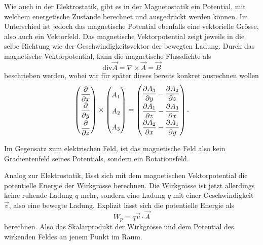 Wie auch in der Elektrostatik, gibt es in der Magnetostatik ein Potential, mit welchem energetische Zustände berechnet und ausgedrückt werden können. Im Unterschied ist jedoch das magnetische Potential ebenfalls eine vektorielle Grösse, also auch ein Vektorfeld. Das magnetische Vektorpotential zeigt jeweils in die selbe Richtung wie der Geschwindigkeitsvektor der bewegten Ladung.
Durch das magnetische Vektorpotential, kann die magnetische Flussdichte als 
\begin{equation}
	\text{div}\vec{A}=\nabla \times \vec{A}
	=
	\vec{B}
	\label{maxwell:definitionVektorpot}
\end{equation}
beschrieben werden, wobei wir für später dieses bereits konkret ausrechnen wollen 
\begin{equation}
	\label{maxwell:nablaA}
	\renewcommand{\arraystretch}{1.9}
	\begin{pmatrix}
		\displaystyle
		\frac{\partial}{\partial x} \\
		\displaystyle
		\frac{\partial}{\partial y} \\
		\displaystyle
		\frac{\partial}{\partial z}
	\end{pmatrix}
	\times
	\begin{pmatrix}
		\displaystyle
		A_1 \\
		A_2 \\
		A_3 \\
	\end{pmatrix}
	=
	\begin{pmatrix}
		\displaystyle
		\frac{\partial A_3}{\partial y} -\frac{\partial A_2}{\partial z}\\
		\displaystyle
		\frac{\partial A_1}{\partial z} -\frac{\partial A_3}{\partial x}\\
		\displaystyle
		\frac{\partial A_2}{\partial x} -\frac{\partial A_1}{\partial y}
	\end{pmatrix}.
\end{equation}

Im Gegensatz zum elektrischen Feld, ist das magnetische Feld also kein Gradientenfeld seines Potentials, sondern ein Rotationsfeld.

Analog zur Elektrostatik, lässt sich mit dem magnetischen Vektorpotential die potentielle Energie der Wirkgrösse berechnen. Die Wirkgrösse ist jetzt allerdings keine ruhende Ladung $q$ mehr, sondern eine Ladung $q$ mit einer Geschwindigkeit $\vec{v}$, also eine bewegte Ladung. Explizit lässt sich die potentielle Energie als 
\[ W_p =  q\vec{v}\cdot\vec{A}\]
berechnen. Also das Skalarprodukt der Wirkgrösse und dem Potential des wirkenden Feldes an jenem Punkt im Raum.

